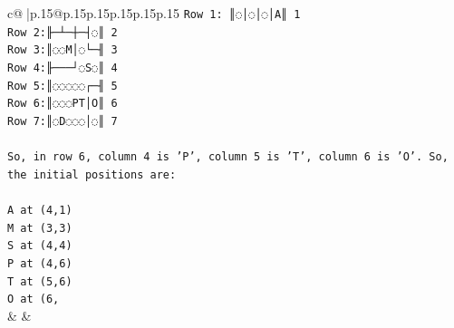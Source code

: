 \documentclass{article}
\begin{document}
{\begin{supertabular}{c@{$\;$}|p{.15\linewidth}@{}p{.15\linewidth}p{.15\linewidth}p{.15\linewidth}p{.15\linewidth}p{.15\linewidth}}
{{{\texttt{Row 1: ║◌│◌│◌│A║ 1} \\
\texttt{Row 2:╟─┴─┼─┤◌║ 2} \\
\texttt{Row 3:║◌◌M│◌└─╢ 3} \\
\texttt{Row 4:╟───┘◌S◌║ 4} \\
\texttt{Row 5:║◌◌◌◌◌┌─╢ 5} \\
\texttt{Row 6:║◌◌◌PT│O║ 6} \\
\texttt{Row 7:║◌D◌◌◌│◌║ 7} \\
\\ 
\texttt{So, in row 6, column 4 is 'P', column 5 is 'T', column 6 is 'O'. So, the initial positions are:} \\
\\ 
\texttt{A at (4,1)} \\
\texttt{M at (3,3)} \\
\texttt{S at (4,4)} \\
\texttt{P at (4,6)} \\
\texttt{T at (5,6)} \\
\texttt{O at (6,} \\
            }
        }
    }
    & & \\ \\


\end{supertabular}}
\end{document}
